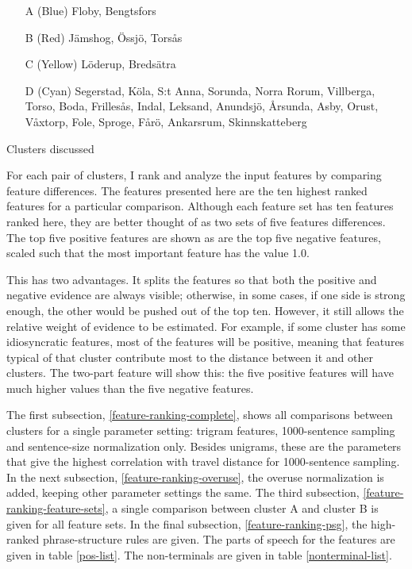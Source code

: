 \begin{table}
  \begin{enumerate}
   \item[A] (Blue) Floby, Bengtsfors
    \item[B] (Red) J\"amshog, \"Ossj\"o, Tors\aa{}s
    \item[C] (Yellow) L\"oderup, Breds\"atra
    \item[D] (Cyan) Segerstad, K\"ola, S:t Anna, Sorunda, Norra Rorum,
      Villberga, Torso, Boda, Frilles\aa{}s, Indal, Leksand, Anundsj\"o,
      \AA{}rsunda, Asby, Orust, V\aa{}xtorp, Fole, Sproge, F\aa{}r\"o,
      Ankarsrum, Skinnskatteberg
  \end{enumerate}
  \caption{Clusters discussed}
  \label{feature-ranking-clusters}
\end{table}

For each pair of clusters, I rank and analyze the input features by
comparing feature differences. The features presented here are the ten
highest ranked features for a particular comparison. Although each
feature set has ten features ranked here, they are better thought of
as two sets of five features differences. The top five positive
features are shown as are the top five negative features, scaled such
that the most important feature has the value 1.0.

This has two advantages. It splits the features so that both the
positive and negative evidence are always visible; otherwise, in some
cases, if one side is strong enough, the other would be pushed out of
the top ten. However, it still allows the relative weight of evidence
to be estimated. For example, if some cluster has some idiosyncratic
features, most of the features will be positive, meaning that features
typical of that cluster contribute most to the distance between it and
other clusters. The two-part feature will show this: the five positive
features will have much higher values than the five negative features.


The first subsection, \ref{feature-ranking-complete}, shows all
comparisons between clusters for a single parameter setting: trigram
features, 1000-sentence sampling and sentence-size normalization
only. Besides unigrams, these are the parameters that give the highest
correlation with travel distance for 1000-sentence sampling.
In the next subsection, \ref{feature-ranking-overuse}, the overuse
normalization is added, keeping other parameter settings the same.
The third subsection, \ref{feature-ranking-feature-sets},
a single comparison between cluster A and cluster B is given for
all feature sets.
In the final subsection, \ref{feature-ranking-psg}, the high-ranked
phrase-structure rules are given.
The parts of speech for the features are given in table
\ref{pos-list}. The non-terminals are given in table
\ref{nonterminal-list}.

